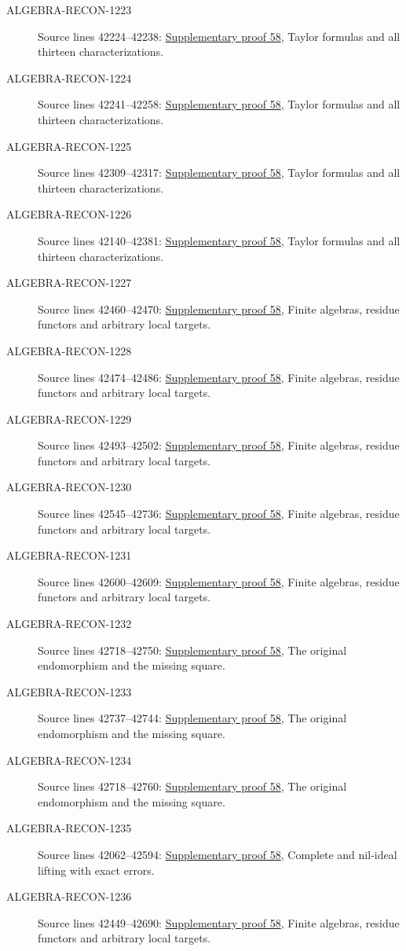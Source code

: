 \begin{description}
\item[ALGEBRA-RECON-1223] Source lines 42224--42238: \hyperlink{algebra_henselian_notes_20260929}{Supplementary proof 58}, Taylor formulas and all thirteen characterizations.
\item[ALGEBRA-RECON-1224] Source lines 42241--42258: \hyperlink{algebra_henselian_notes_20260929}{Supplementary proof 58}, Taylor formulas and all thirteen characterizations.
\item[ALGEBRA-RECON-1225] Source lines 42309--42317: \hyperlink{algebra_henselian_notes_20260929}{Supplementary proof 58}, Taylor formulas and all thirteen characterizations.
\item[ALGEBRA-RECON-1226] Source lines 42140--42381: \hyperlink{algebra_henselian_notes_20260929}{Supplementary proof 58}, Taylor formulas and all thirteen characterizations.
\item[ALGEBRA-RECON-1227] Source lines 42460--42470: \hyperlink{algebra_henselian_notes_20260929}{Supplementary proof 58}, Finite algebras, residue functors and arbitrary local targets.
\item[ALGEBRA-RECON-1228] Source lines 42474--42486: \hyperlink{algebra_henselian_notes_20260929}{Supplementary proof 58}, Finite algebras, residue functors and arbitrary local targets.
\item[ALGEBRA-RECON-1229] Source lines 42493--42502: \hyperlink{algebra_henselian_notes_20260929}{Supplementary proof 58}, Finite algebras, residue functors and arbitrary local targets.
\item[ALGEBRA-RECON-1230] Source lines 42545--42736: \hyperlink{algebra_henselian_notes_20260929}{Supplementary proof 58}, Finite algebras, residue functors and arbitrary local targets.
\item[ALGEBRA-RECON-1231] Source lines 42600--42609: \hyperlink{algebra_henselian_notes_20260929}{Supplementary proof 58}, Finite algebras, residue functors and arbitrary local targets.
\item[ALGEBRA-RECON-1232] Source lines 42718--42750: \hyperlink{algebra_henselian_notes_20260929}{Supplementary proof 58}, The original endomorphism and the missing square.
\item[ALGEBRA-RECON-1233] Source lines 42737--42744: \hyperlink{algebra_henselian_notes_20260929}{Supplementary proof 58}, The original endomorphism and the missing square.
\item[ALGEBRA-RECON-1234] Source lines 42718--42760: \hyperlink{algebra_henselian_notes_20260929}{Supplementary proof 58}, The original endomorphism and the missing square.
\item[ALGEBRA-RECON-1235] Source lines 42062--42594: \hyperlink{algebra_henselian_notes_20260929}{Supplementary proof 58}, Complete and nil-ideal lifting with exact errors.
\item[ALGEBRA-RECON-1236] Source lines 42449--42690: \hyperlink{algebra_henselian_notes_20260929}{Supplementary proof 58}, Finite algebras, residue functors and arbitrary local targets.
\end{description}


